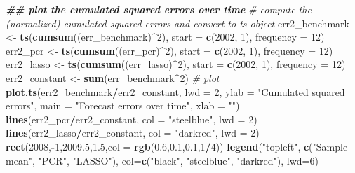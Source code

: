 \documentclass[
]{book}
\newenvironment{Shaded}{\begin{snugshade}}{\end{snugshade}}
\newcommand{\AttributeTok}[1]{\textcolor[rgb]{0.13,0.29,0.53}{#1}}
\newcommand{\CommentTok}[1]{\textcolor[rgb]{0.56,0.35,0.01}{\textit{#1}}}
\newcommand{\DecValTok}[1]{\textcolor[rgb]{0.00,0.00,0.81}{#1}}
\newcommand{\DocumentationTok}[1]{\textcolor[rgb]{0.56,0.35,0.01}{\textbf{\textit{#1}}}}
\newcommand{\FloatTok}[1]{\textcolor[rgb]{0.00,0.00,0.81}{#1}}
\newcommand{\FunctionTok}[1]{\textcolor[rgb]{0.13,0.29,0.53}{\textbf{#1}}}
\newcommand{\NormalTok}[1]{#1}
\newcommand{\OtherTok}[1]{\textcolor[rgb]{0.56,0.35,0.01}{#1}}
\newcommand{\SpecialCharTok}[1]{\textcolor[rgb]{0.81,0.36,0.00}{\textbf{#1}}}
\newcommand{\StringTok}[1]{\textcolor[rgb]{0.31,0.60,0.02}{#1}}
\begin{document}
\begin{Shaded}
\begin{Highlighting}[]
\DocumentationTok{\#\# plot the cumulated squared errors over time}
\CommentTok{\# compute the (normalized) cumulated squared errors and convert to ts object}
\NormalTok{err2\_benchmark }\OtherTok{\textless{}{-}} \FunctionTok{ts}\NormalTok{(}\FunctionTok{cumsum}\NormalTok{((err\_benchmark)}\SpecialCharTok{\^{}}\DecValTok{2}\NormalTok{), }\AttributeTok{start =} \FunctionTok{c}\NormalTok{(}\DecValTok{2002}\NormalTok{, }\DecValTok{1}\NormalTok{), }\AttributeTok{frequency =} \DecValTok{12}\NormalTok{)}
\NormalTok{err2\_pcr       }\OtherTok{\textless{}{-}} \FunctionTok{ts}\NormalTok{(}\FunctionTok{cumsum}\NormalTok{((err\_pcr)}\SpecialCharTok{\^{}}\DecValTok{2}\NormalTok{), }\AttributeTok{start =} \FunctionTok{c}\NormalTok{(}\DecValTok{2002}\NormalTok{, }\DecValTok{1}\NormalTok{), }\AttributeTok{frequency =} \DecValTok{12}\NormalTok{)}
\NormalTok{err2\_lasso     }\OtherTok{\textless{}{-}} \FunctionTok{ts}\NormalTok{(}\FunctionTok{cumsum}\NormalTok{((err\_lasso)}\SpecialCharTok{\^{}}\DecValTok{2}\NormalTok{), }\AttributeTok{start =} \FunctionTok{c}\NormalTok{(}\DecValTok{2002}\NormalTok{, }\DecValTok{1}\NormalTok{), }\AttributeTok{frequency =} \DecValTok{12}\NormalTok{)}
\NormalTok{err2\_constant  }\OtherTok{\textless{}{-}} \FunctionTok{sum}\NormalTok{(err\_benchmark}\SpecialCharTok{\^{}}\DecValTok{2}\NormalTok{)}
\CommentTok{\# plot}
\FunctionTok{plot.ts}\NormalTok{(err2\_benchmark}\SpecialCharTok{/}\NormalTok{err2\_constant, }\AttributeTok{lwd =} \DecValTok{2}\NormalTok{,}
        \AttributeTok{ylab =} \StringTok{"Cumulated squared errors"}\NormalTok{,}
        \AttributeTok{main =} \StringTok{"Forecast errors over time"}\NormalTok{,}
        \AttributeTok{xlab =} \StringTok{""}\NormalTok{)}
\FunctionTok{lines}\NormalTok{(err2\_pcr}\SpecialCharTok{/}\NormalTok{err2\_constant, }\AttributeTok{col =} \StringTok{"steelblue"}\NormalTok{, }\AttributeTok{lwd =} \DecValTok{2}\NormalTok{)}
\FunctionTok{lines}\NormalTok{(err2\_lasso}\SpecialCharTok{/}\NormalTok{err2\_constant, }\AttributeTok{col =} \StringTok{"darkred"}\NormalTok{, }\AttributeTok{lwd =} \DecValTok{2}\NormalTok{)}
\FunctionTok{rect}\NormalTok{(}\DecValTok{2008}\NormalTok{,}\SpecialCharTok{{-}}\DecValTok{1}\NormalTok{,}\FloatTok{2009.5}\NormalTok{,}\FloatTok{1.5}\NormalTok{,}\AttributeTok{col =} \FunctionTok{rgb}\NormalTok{(}\FloatTok{0.6}\NormalTok{,}\FloatTok{0.1}\NormalTok{,}\FloatTok{0.1}\NormalTok{,}\DecValTok{1}\SpecialCharTok{/}\DecValTok{4}\NormalTok{))}
\FunctionTok{legend}\NormalTok{(}\StringTok{"topleft"}\NormalTok{, }\FunctionTok{c}\NormalTok{(}\StringTok{"Sample mean"}\NormalTok{, }\StringTok{"PCR"}\NormalTok{, }\StringTok{"LASSO"}\NormalTok{), }
       \AttributeTok{col=}\FunctionTok{c}\NormalTok{(}\StringTok{"black"}\NormalTok{, }\StringTok{"steelblue"}\NormalTok{, }\StringTok{"darkred"}\NormalTok{), }\AttributeTok{lwd=}\DecValTok{6}\NormalTok{)}
\end{Highlighting}
\end{Shaded}
\end{document}
